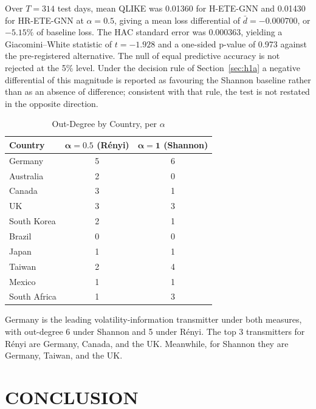 \documentclass[12pt,oneside]{report}
\begin{document}
Over $T = 314$ test days, mean QLIKE was 0.01360 for H-ETE-GNN and
0.01430 for HR-ETE-GNN at $\alpha = 0.5$, giving a mean loss
differential of $\bar{d} = -0.000700$, or $-5.15\%$ of baseline loss.
The HAC standard error was 0.000363, yielding a Giacomini--White
statistic of $t = -1.928$ and a one-sided p-value of 0.973 against the
pre-registered alternative. The null of equal predictive accuracy is not
rejected at the 5\% level. Under the decision rule of
Section~\ref{sec:h1a} a negative differential of this magnitude is
reported as favouring the Shannon baseline rather than as an absence of
difference; consistent with that rule, the test is not restated in the
opposite direction.

\begin{table}[htbp]
  \centering
  \singlespacing
  \caption{Out-Degree by Country, per $\alpha$}\label{tab:outdegree}
  \begin{tabular}{lcc}
    \toprule
    \textbf{Country} & $\boldsymbol{\alpha = 0.5}$ \textbf{(Rényi)} & $\boldsymbol{\alpha = 1}$ \textbf{(Shannon)} \\
    \midrule
    Germany      & 5 & 6 \\
    Australia    & 2 & 0 \\
    Canada       & 3 & 1 \\
    UK           & 3 & 3 \\
    South Korea  & 2 & 1 \\
    Brazil       & 0 & 0 \\
    Japan        & 1 & 1 \\
    Taiwan       & 2 & 4 \\
    Mexico       & 1 & 1 \\
    South Africa & 1 & 3 \\
    \bottomrule
  \end{tabular}
\end{table}

Germany is the leading volatility-information transmitter under both
measures, with out-degree 6 under Shannon and 5 under Rényi. The top 3
transmitters for Rényi are Germany, Canada, and the UK. Meanwhile, for
Shannon they are Germany, Taiwan, and the UK.

\chapter{CONCLUSION}\label{ch:conclusion}
\end{document}
